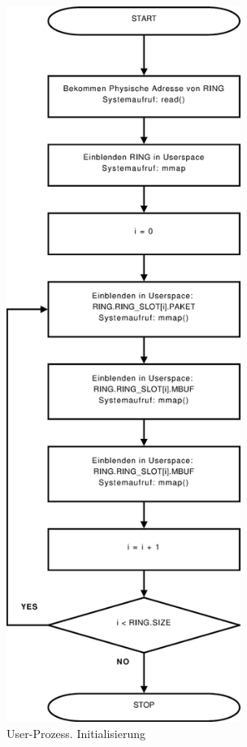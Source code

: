 \begin{figure}
\centering 
\includegraphics[width=3.0in]{bilder/FlowChart_US_Init}
\caption{User-Prozess. Initialisierung}
\label{img:us_init}
\end{figure}
 
